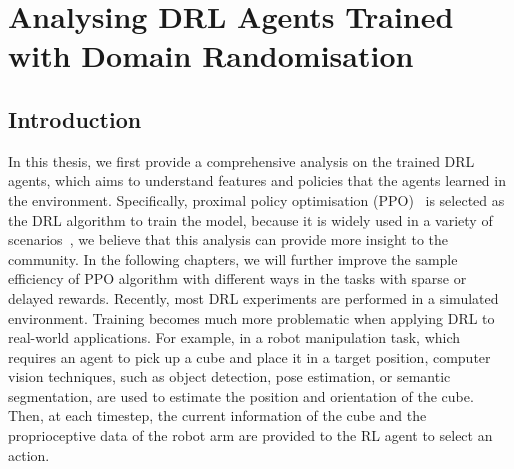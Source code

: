 \chapter{Analysing DRL Agents Trained with Domain Randomisation}
\label{ch:drl_interp}
\section{Introduction}
In this thesis, we first provide a comprehensive analysis on the trained DRL agents, which aims to understand features and policies that the agents learned in the environment. Specifically, proximal policy optimisation (PPO)~\cite{schulman2017proximal} is selected as the DRL algorithm to train the model, because it is widely used in a variety of scenarios~\cite{berner2019dota,rajeswaran2017learning,vinyals2019grandmaster}, we believe that this analysis can provide more insight to the community. In the following chapters, we will further improve the sample efficiency of PPO algorithm with different ways in the tasks with sparse or delayed rewards. Recently, most DRL experiments are performed in a simulated environment. Training becomes much more problematic when applying DRL to real-world applications. For example, in a robot manipulation task, which requires an agent to pick up a cube and place it in a target position, computer vision techniques, such as object detection, pose estimation, or semantic segmentation, are used to estimate the position and orientation of the cube. Then, at each timestep, the current information of the cube and the proprioceptive data of the robot arm are provided to the RL agent to select an action. 

